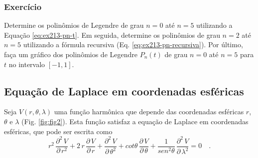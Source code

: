 \documentclass[10pt,a4paper,fleqn]{article}
\begin{document}
\subsubsection{Exerc\'{i}cio}

Determine os polin\^{o}mios de Legendre de grau $n = 0$ at\'{e} $n = 5$ utilizando a Equação \ref{eq:ex213-pn-t}. Em seguida, determine os polin\^{o}mios de grau $n = 2$ at\'{e} $n = 5$ utilizando a f\'{o}rmula recursiva 
(Eq. \ref{eq:ex213-pn-recursiva}). Por último, faça um gr\'{a}fico dos polin\^{o}mios de Legendre $P_{n}(t)$ de grau 
$n = 0$ at\'{e} $n = 5$ para $t$ no intervalo $[-1,1]$. 

\begin{flushleft}
\dotfill
\end{flushleft}

\subsection{Equaç\~{a}o de Laplace em coordenadas esf\'{e}ricas}

Seja $V(r,\theta,\lambda)$ uma funç\~{a}o harm\^{o}nica que depende das coordenadas esf\'{e}ricas $r$, $\theta$ e $\lambda$ 
(Fig. \ref{fig:fig2}). Esta funç\~{a}o satisfaz a equaç\~{a}o de Laplace em coordenadas esf\'{e}ricas, que pode ser escrita como
\begin{equation}
r^{2} \, \frac{\partial^{2} \, V}{\partial \, r^{2}} +
2 \, r \, \frac{\partial \, V}{\partial \, r} +
\frac{\partial^{2} \, V}{\partial \, \theta^{2}} +
cot \theta \, \frac{\partial \, V}{\partial \, \theta} +
\frac{1}{sen^{2} \theta} \, \frac{\partial^{2} \, V}{\partial \, \lambda^{2}} = 0 \quad .
\label{eq:ex214-eq-Laplace-esferica}
\end{equation}
\end{document}
